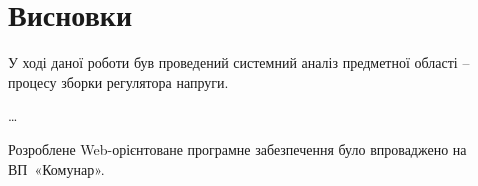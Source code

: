 \section*{Висновки}

У ході даної роботи був проведений системний аналіз предметної області –
процесу зборки регулятора напруги.

…

Розроблене Web-орієнтоване програмне забезпечення було впроваджено на 
ВП~«Комунар».
